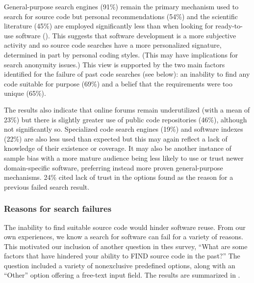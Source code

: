 \documentclass{casicswhitepaper}
\begin{document}

General-purpose search engines (91\%) remain the primary mechanism used to search for source code but personal recommendations (54\%) and the scientific literature (45\%) are employed significantly less than when looking for ready-to-use software (). This suggests that software development is a more subjective activity and so source code searches have a more personalized signature, determined in part by personal coding styles. (This may have implications for search anonymity issues.) This view is supported by the two main factors identified for the failure of past code searches (see below): an inability to find any code suitable for purpose (69\%) and a belief that the requirements were too unique (65\%).

The results also indicate that online forums remain underutilized (with a mean of 23\%) but there is slightly greater use of public code repositories (46\%), although not significantly so. Specialized code search engines (19\%) and software indexes (22\%) are also less used than expected but this may again reflect a lack of knowledge of their existence or coverage. It may also be another instance of sample bias with a more mature audience being less likely to use or trust newer domain-specific software, preferring instead more proven general-purpose mechanisms.  24\% cited lack of trust in the options found as the reason for a previous failed search result.


\subsubsection{Reasons for search failures}

The inability to find suitable source code would hinder software reuse.  From our own experiences, we know a search for software can fail for a variety of reasons.  This motivated our inclusion of another question in thes survey, ``What are some factors that have hindered your ability to FIND source code in the past?''  The question included a variety of nonexclusive predefined options, along with an ``Other'' option offering a free-text input field.  The results are summarized in .
\end{document}
